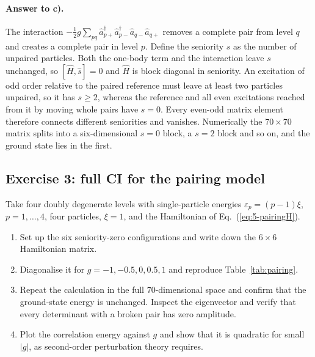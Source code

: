 \paragraph{Answer to c).}
The interaction
$-\tfrac12 g\sum_{pq}\hat{a}^{\dagger}_{p+}\hat{a}^{\dagger}_{p-}
\hat{a}_{q-}\hat{a}_{q+}$ removes a complete pair from level $q$ and creates a
complete pair in level $p$.  Define the seniority $s$ as the number of
unpaired particles.  Both the one-body term and the interaction leave $s$
unchanged, so $[\hat{H},\hat{s}]=0$ and $\hat{H}$ is block diagonal in
seniority.  An excitation of odd order relative to the paired reference must
leave at least two particles unpaired, so it has $s\ge2$, whereas the
reference and all even excitations reached from it by moving whole pairs have
$s=0$.  Every even-odd matrix element therefore connects different seniorities
and vanishes.  Numerically the $70\times70$ matrix splits into a
six-dimensional $s=0$ block, a $s=2$ block and so on, and the ground state
lies in the first.

\subsection*{Exercise 3: full CI for the pairing model}
\label{ex:5-pairingfci}

Take four doubly degenerate levels with single-particle energies
$\varepsilon_p=(p-1)\xi$, $p=1,\dots,4$, four particles, $\xi=1$, and the
Hamiltonian of Eq.~(\ref{eq:5-pairingH}).

\begin{enumerate}
  \item[a)] Set up the six seniority-zero configurations and write down the
  $6\times6$ Hamiltonian matrix.
  \item[b)] Diagonalise it for $g=-1,-0.5,0,0.5,1$ and reproduce
  Table~\ref{tab:pairing}.
  \item[c)] Repeat the calculation in the full $70$-dimensional space and
  confirm that the ground-state energy is unchanged.  Inspect the eigenvector
  and verify that every determinant with a broken pair has zero amplitude.
  \item[d)] Plot the correlation energy against $g$ and show that it is
  quadratic for small $|g|$, as second-order perturbation theory requires.
\end{enumerate}

